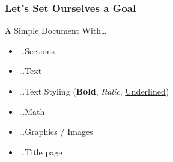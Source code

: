 \begin{frame}
    \frametitle{Let's Set Ourselves a Goal}
    A Simple Document With\ldots
    \begin{itemize}
        \item<+-> \ldots Sections
        \item<+-> \ldots Text
        \item<+-> \ldots Text Styling (\textbf{Bold}, \textit{Italic}, \underline{Underlined})
        \item<+-> \ldots Math
        \item<+-> \ldots Graphics / Images
        \item<+-> \ldots Title page
    \end{itemize}
\end{frame}
